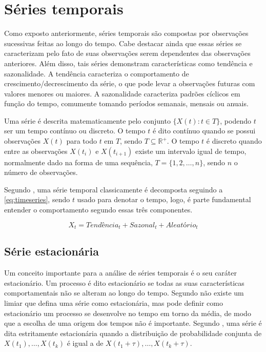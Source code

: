 \documentclass[
    12pt,
    oneside,
    a4paper,
    english,
    brazil
]{abntex2}
\begin{document}
\section{Séries temporais}\label{sec:seriesTemporais}

Como  exposto anteriormente,  séries  temporais são  compostas por  observações
sucessivas  feitas ao  longo do  tempo. Cabe  destacar ainda  que essas  séries
se  caracterizam   pelo  fato  de   suas  observações  serem   dependentes  das
observações  anteriores. Além  disso,  tais  séries demonstram  características
como  tendência e  sazonalidade.  A tendência  caracteriza  o comportamento  de
crescimento/decrescimento da série, o que  pode levar a observações futuras com
valores  menores ou  maiores. A  sazonalidade caracteriza  padrões cíclicos  em
função do tempo, comumente tomando períodos semanais, mensais ou anuais.

Uma série é descrita matematicamente pelo conjunto $\{X(t): t \in T\}$, podendo
$t$ ser  um tempo  contínuo ou  discreto. O  tempo $t$  é dito  contínuo quando
se  possui  observações  $X(t)$  para  todo $t$  em  $T$,  sendo  $T  \subseteq
\mathbb{R}^{+}$. O tempo $t$ é discreto  quando entre as observações $X(t_i)$ e
$X(t_{i+1})$ existe um  intervalo igual de tempo, normalmente dado  na forma de
uma sequência, $T = \{1, 2, \ldots, n\}$, sendo $n$ o número de observações.

Segundo  , uma  série  temporal  classicamente é  decomposta
seguindo a \autoref{eq:timeseries}, sendo $t$ usado para denotar o tempo, logo,
é parte fundamental entender o comportamento segundo essas três componentes.

\begin{equation}
    \label{eq:timeseries}
    X_t = Tendência_t + Sazonal_t + Aleatório_t
\end{equation}

\subsection{Série estacionária}\label{sec:estacionaria}

Um  conceito   importante  para  a  análise   de  séries  temporais  é   o  seu
caráter  estacionário.  Um  processo  é  dito estacionário  se  todas  as  suas
características  comportamentais não  se  alteram ao  longo  do tempo.  Segundo
 não existe  um limiar que defina  uma série como
estacionária, mas pode  definir como estacionário um processo  se desenvolve no
tempo em  torno da média, de  modo que a escolha  de uma origem dos  tempos não
é  importante.  Segundo  ,  uma série  é  dita  estritamente
estacionária  quando  a  distribuição  de probabilidade  conjunta  de  $X(t_1),
\ldots, X(t_k)$ é igual a de $X(t_1 + \tau), \ldots, X(t_k + \tau)$.
\end{document}
